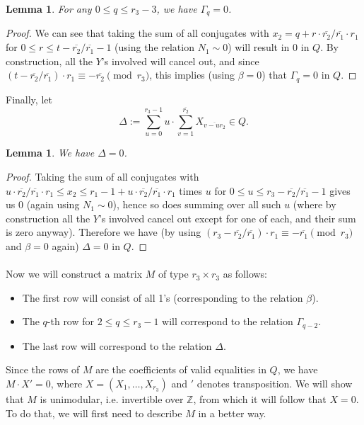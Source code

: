 \documentclass[12pt,a4paper]{article}
\newtheorem{lemma}[theorem]{Lemma}
\theoremstyle{definition}
\newcommand{\Z}{\mathbb{Z}}
\newcommand{\uo}{\overline{r_2}}
\newcommand{\vo}{\overline{r_1}}
\begin{document}
\begin{lemma}
For any $0\leq q \leq r_3-3$, we have $\Gamma_q=0$.
\end{lemma}
\begin{proof}
We can see that taking the sum of all conjugates with $x_2=q+r\cdot \uo/\vo\cdot r_1$ for $0\leq r\leq t-\uo/\vo-1$ (using the relation $N_1\sim 0$) will result in $0$ in $Q$. By construction, all the $Y$'s involved will cancel out, and since $(t-\uo/\vo)\cdot r_1\equiv -\uo \pmod{r_3}$, this implies (using $\beta=0$) that $\Gamma_q=0$ in $Q.$
\end{proof}

Finally, let $$\Delta:=\sum_{u=0}^{r_3-1}u\cdot\sum_{v=1}^{\uo}X_{\overline{v-ur_2}}\in Q.$$

\begin{lemma}
We have $\Delta=0$.
\end{lemma}
\begin{proof}
Taking the sum of all conjugates with $u\cdot \uo/\vo\cdot r_1\leq x_2\leq r_1-1+u\cdot \uo/\vo\cdot r_1$ times $u$ for $0\leq u\leq r_3-\uo/\vo-1$ gives us $0$ (again using $N_1\sim 0$), hence so does summing over all such $u$ (where by construction all the $Y$'s involved cancel out except for one of each, and their sum is zero anyway). Therefore we have (by using $(r_3-\uo/\vo)\cdot r_1\equiv -\vo \pmod{r_3}$ and $\beta=0$ again) $\Delta=0$ in $Q$.
\end{proof}

\paragraph*{}
Now we will construct a matrix $M$ of type $r_3\times r_3$ as follows:
\begin{itemize}
\item The first row will consist of all 1's (corresponding to the relation $\beta$).
\item The $q$-th row for $2\leq q\leq r_3-1$ will correspond to the relation $\Gamma_{q-2}$.
\item The last row will correspond to the relation $\Delta$.
\end{itemize}

Since the rows of $M$ are the coefficients of valid equalities in $Q$, we have $M\cdot X'=0$, where $X=(X_1,\dots,X_{r_3})$ and $'$ denotes transposition. We will show that $M$ is unimodular, i.e. invertible over $\Z$, from which it will follow that $X=0$. To do that, we will first need to describe $M$ in a better way.
\end{document}
